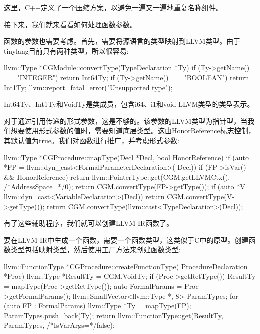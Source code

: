 这里，C++定义了一个压缩方案，以避免一遍又一遍地重复名称组件。

接下来，我们就来看看如何处理函数参数。


函数的参数也需要考虑。首先，需要将源语言的类型映射到LLVM类型。由于tinylang目前只有两种类型，所以很容易:

\begin{cpp}
llvm::Type *CGModule::convertType(TypeDeclaration *Ty) {
    if (Ty->getName() == "INTEGER")
        return Int64Ty;
    if (Ty->getName() == "BOOLEAN")
        return Int1Ty;
    llvm::report_fatal_error("Unsupported type");
}
\end{cpp}

Int64Ty、Int1Ty和VoidTy是类成员，包含i64、i1和void LLVM类型的类型表示。

对于通过引用传递的形式参数，这是不够的。该参数的LLVM类型为指针型，当我们想要使用形式参数的值时，需要知道底层类型。这由HonorReference标志控制，其默认值为true。我们对函数进行推广，并考虑形式参数:

\begin{cpp}
llvm::Type *CGProcedure::mapType(Decl *Decl,
                                 bool HonorReference) {
    if (auto *FP = llvm::dyn_cast<FormalParameterDeclaration>(
    Decl)) {
        if (FP->isVar() && HonorReference)
        return llvm::PointerType::get(CGM.getLLVMCtx(),
        /*AddressSpace=*/0);
        return CGM.convertType(FP->getType());
    }
    if (auto *V = llvm::dyn_cast<VariableDeclaration>(Decl))
        return CGM.convertType(V->getType());
    return CGM.convertType(llvm::cast<TypeDeclaration>(Decl));
}
\end{cpp}

有了这些辅助程序，我们就可以创建LLVM IR函数了。


要在LLVM IR中生成一个函数，需要一个函数类型，这类似于C中的原型。创建函数类型包括映射类型，然后使用工厂方法来创建函数类型:

\begin{cpp}
llvm::FunctionType *CGProcedure::createFunctionType(
ProcedureDeclaration *Proc) {
    llvm::Type *ResultTy = CGM.VoidTy;
    if (Proc->getRetType()) {
        ResultTy = mapType(Proc->getRetType());
    }
    auto FormalParams = Proc->getFormalParams();
    llvm::SmallVector<llvm::Type *, 8> ParamTypes;
    for (auto FP : FormalParams) {
        llvm::Type *Ty = mapType(FP);
        ParamTypes.push_back(Ty);
    }
    return llvm::FunctionType::get(ResultTy, ParamTypes,
                                    /*IsVarArgs=*/false);
}
\end{cpp}

